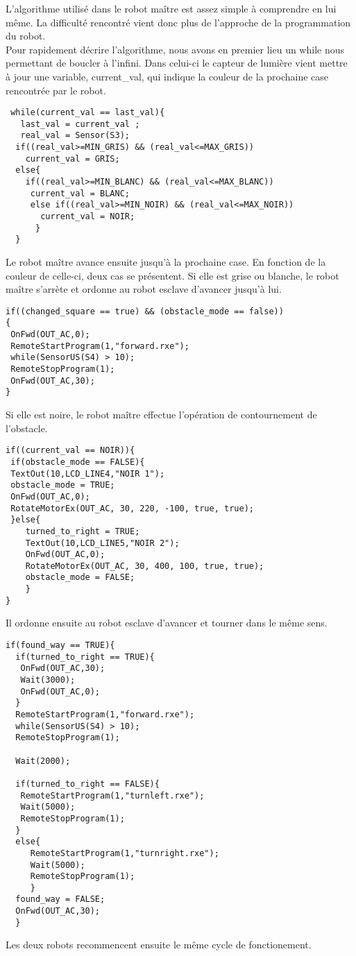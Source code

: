 L'algorithme utilisé dans le robot maître est assez simple à comprendre
en lui même. La difficulté rencontré vient donc plus de l'approche de la
programmation du robot.
\\
Pour rapidement décrire l'algorithme, nous avons en premier lieu un while nous
permettant de boucler à l'infini. Dans celui-ci le capteur de lumière
vient mettre à jour une variable, current\_val, qui indique la couleur de la prochaine
case rencontrée par le robot.

\begin{verbatim} 
 while(current_val == last_val){
   last_val = current_val ;
   real_val = Sensor(S3);
  if((real_val>=MIN_GRIS) && (real_val<=MAX_GRIS))
    current_val = GRIS;
  else{
    if((real_val>=MIN_BLANC) && (real_val<=MAX_BLANC))
     current_val = BLANC;
     else if((real_val>=MIN_NOIR) && (real_val<=MAX_NOIR))
       current_val = NOIR;
      }
  } 
\end{verbatim}

Le robot maître avance ensuite jusqu'à la prochaine case. En fonction de la
couleur de celle-ci, deux cas se présentent.
Si elle est grise ou blanche, le robot maître s'arrète et ordonne au
robot esclave d'avancer jusqu'à lui.

\begin{verbatim}
if((changed_square == true) && (obstacle_mode == false))
{
 OnFwd(OUT_AC,0);
 RemoteStartProgram(1,"forward.rxe");
 while(SensorUS(S4) > 10);
 RemoteStopProgram(1);
 OnFwd(OUT_AC,30);
}
\end{verbatim}

Si elle est noire, le robot maître effectue l'opération de contournement
de l'obstacle.

\begin{verbatim} 
if((current_val == NOIR)){
 if(obstacle_mode == FALSE){
 TextOut(10,LCD_LINE4,"NOIR 1");
 obstacle_mode = TRUE;
 OnFwd(OUT_AC,0);
 RotateMotorEx(OUT_AC, 30, 220, -100, true, true);
 }else{
    turned_to_right = TRUE;
    TextOut(10,LCD_LINE5,"NOIR 2");
    OnFwd(OUT_AC,0);
    RotateMotorEx(OUT_AC, 30, 400, 100, true, true);
    obstacle_mode = FALSE;
    }
}
\end{verbatim}

Il ordonne ensuite au robot esclave d'avancer et tourner dans le même
sens. 

\begin{verbatim}
if(found_way == TRUE){
  if(turned_to_right == TRUE){
   OnFwd(OUT_AC,30);
   Wait(3000);
   OnFwd(OUT_AC,0);
  }
  RemoteStartProgram(1,"forward.rxe");
  while(SensorUS(S4) > 10);
  RemoteStopProgram(1);
 
  Wait(2000);
 
  if(turned_to_right == FALSE){
   RemoteStartProgram(1,"turnleft.rxe");
   Wait(5000);
   RemoteStopProgram(1);
  }
  else{
     RemoteStartProgram(1,"turnright.rxe");
     Wait(5000);
     RemoteStopProgram(1);
     }
  found_way = FALSE;
  OnFwd(OUT_AC,30);
  }
\end{verbatim}

Les deux robots recommencent ensuite le même cycle de fonctionement.
